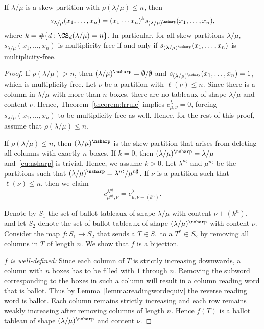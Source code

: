 \begin{prop}
\label{prop:reductionnsharp}
If $\lambda / \mu$ is a skew partition with $\rho(\lambda/\mu)\leq n$, then 
\begin{equation}
\label{eq:nsharp}
s_{\lambda / \mu}(x_1,\ldots,x_n) = (x_1 \cdots x_n)^k s_{(\lambda / \mu)^{\nsharp}}(x_1,\ldots,x_n),
\end{equation}
where $k = \# \{ d : \CS _d(\lambda / \mu) = n \}$. In particular, for all skew partitions $\lambda/\mu$, $s_{\lambda / \mu}(x_1,\ldots,x_n)$ is multiplicity-free if and only if $s_{(\lambda / \mu)^{\nsharp }}(x_1,\ldots,x_n)$ is multiplicity-free.
\end{prop}
\begin{proof}
If $\rho(\lambda / \mu) > n$, then $(\lambda / \mu)^{\nsharp } = \emptyset / \emptyset$ and $s_{(\lambda / \mu)^{\nsharp }}(x_1,\ldots,x_n) = 1$, which is multiplicity free. Let $\nu$ be a partition with $\ell(\nu) \leq n$. Since there is a column in $\lambda / \mu$ with more than $n$ boxes, there are no tableaux of shape $\lambda / \mu$ and content $\nu$. Hence, Theorem~\ref{theorem:lrrule} implies $c_{\mu, \nu}^{\lambda} = 0$, forcing $s_{\lambda / \mu}(x_1,\ldots,x_n)$ to be multiplicity free as well. Hence, for the rest of this proof, assume that $\rho(\lambda/\mu)\leq n$.

If $\rho(\lambda / \mu) \leq n$, then $(\lambda / \mu)^{\nsharp }$ is the skew partition that arises from deleting all columns with exactly $n$ boxes. If $k = 0$, then $(\lambda / \mu)^{\nsharp }=\lambda / \mu$ and~\eqref{eq:nsharp} is trivial. Hence, we assume $k > 0$. Let $\lambda^{n\sharp}$ and $\mu^{n\sharp}$ be the partitions such that $(\lambda / \mu)^{\nsharp } = \lambda^{n\sharp} / \mu^{n\sharp}$. If $\nu$ is a partition such that $\ell(\nu) \leq n$, then we claim
\begin{equation}
\label{eq:nsharpLR}
c_{\mu^{n\sharp}, \nu}^{\lambda^{n\sharp}} = c_{\mu, \nu + (k^n)}^{\lambda}.
\end{equation}

Denote by $S_1$ the set of ballot tableaux of shape $\lambda/\mu$ with content $\nu + (k^n)$, and let $S_2$ denote the set of ballot tableaux of shape $(\lambda / \mu)^{\nsharp }$ with content $\nu$. Consider the map $f:S_1\xrightarrow{}S_2$ that sends a $T \in S_1$ to a $T^* \in S_2$ by removing all columns in $T$ of length $n$. We show that $f$ is a bijection.

\emph{$f$ is well-defined:} Since each column of $T$ is strictly increasing downwards, a column with $n$ boxes has to be filled with $1$ through $n$. Removing the subword corresponding to the boxes in such a column will result in a column reading word that is ballot. Thus by Lemma~\ref{lemma:readingwordequiv} the reverse reading word is ballot. Each column remains strictly increasing and each row remains weakly increasing after removing columns of length $n$. Hence $f(T)$ is a ballot tableau of shape $(\lambda / \mu)^{\nsharp }$ and content $\nu$.


\end{proof}
